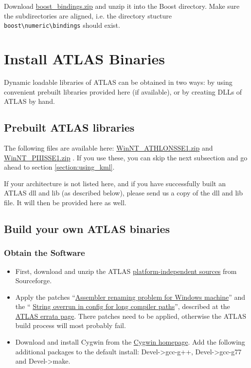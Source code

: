 \documentclass{article}
\begin{document}
Download \href{research/kml/boost\_bindings.zip}{boost\_bindings.zip}
and unzip it into the Boost directory. Make sure the subdirectories are aligned, 
i.e. the directory stucture 
\texttt{boost\textbackslash{}numeric\textbackslash{}bindings} should exist. 


\section{Install ATLAS Binaries}

Dynamic loadable libraries of ATLAS can be obtained in two ways: by using 
convenient prebuilt libraries provided here (if available), or by creating DLLs
of ATLAS by hand. 

\subsection{Prebuilt ATLAS libraries}

The following files are available here: 
\href{research/kml/WinNT\_ATHLONSSE1.zip}{WinNT\_ATHLONSSE1.zip}
and
\href{research/kml/WinNT\_PIIISSE1.zip}{WinNT\_PIIISSE1.zip}
. If you use these, you can skip the next subsection and go ahead to 
section \ref{section:using_kml}.

If your architecture is not listed here, and if you have successfully 
built an ATLAS dll and lib (as described below), please send us a copy of the dll and
lib file. It will then be provided here as well.




\subsection{Build your own ATLAS binaries}




\subsubsection{Obtain the Software}

\begin{itemize}
\item First, download and unzip the ATLAS 
\href{http://prdownloads.sourceforge.net/math-atlas/atlas3.6.0.tar.gz?download}
{platform-independent sources}
from Sourceforge. 
\item Apply the patches ``\href{http://math-atlas.sourceforge.net/errata.html#winsse}
{Assembler renaming problem for Windows machine}'' and the ``
\href{http://math-atlas.sourceforge.net/errata.html#longcomp}
{String overrun in config for long compiler paths}'', 
described at the 
\href{http://math-atlas.sourceforge.net/errata.html}
{ATLAS errata page}. There patches need to be applied, otherwise the
ATLAS build process will most probably fail.

\item Download and install Cygwin from the
\href{http://www.cygwin.com/}{Cygwin homepage}. Add the
following additional packages to the default install:
Devel->gcc-g++, Devel->gcc-g77 and Devel->make.

\end{itemize}
\end{document}
